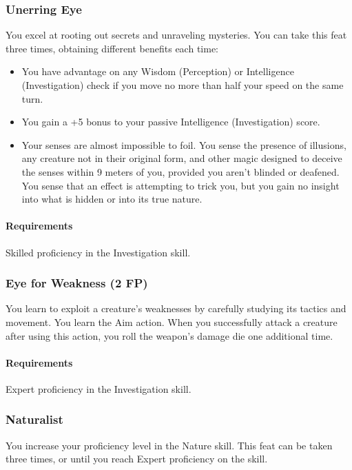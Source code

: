 \subsubsection{Unerring Eye} \label{feat::unerringeye}
    You excel at rooting out secrets and unraveling mysteries.
    You can take this feat three times, obtaining different benefits each time:
    \begin{itemize}
        \item You have advantage on any Wisdom (Perception) or Intelligence (Investigation) check if you move no more than half your speed on the same turn.
        \item You gain a +5 bonus to your passive Intelligence (Investigation) score.
        \item Your senses are almost impossible to foil.
        You sense the presence of illusions, any creature not in their original form, and other magic designed to deceive the senses within 9 meters of you, provided you aren't blinded or deafened.
        You sense that an effect is attempting to trick you, but you gain no insight into what is hidden or into its true nature.
    \end{itemize}
    \paragraph{Requirements} Skilled proficiency in the Investigation skill.
\subsubsection{Eye for Weakness (2 FP)} \label{feat::eyeforweakness}
    You learn to exploit a creature's weaknesses by carefully studying its tactics and movement.
    You learn the Aim action.
    When you successfully attack a creature after using this action, you roll the weapon's damage die one additional time.
    \paragraph{Requirements} Expert proficiency in the Investigation skill.
\subsubsection{Naturalist} \label{feat::naturalist}
    You increase your proficiency level in the Nature skill.
    This feat can be taken three times, or until you reach Expert proficiency on the skill.
